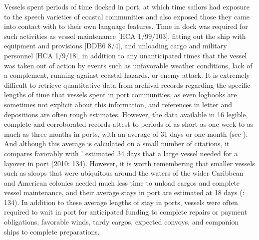 Vessels spent periods of time docked in port, at which time sailors had exposure to the speech varieties of coastal communities and also exposed those they came into contact with to their own language features. Time in dock was required for such activities as vessel maintenance [HCA 1/99/103], fitting out the ship with equipment and provisions [DDB6 8/4], and unloading cargo and military personnel [HCA 1/9/18], in addition to any unanticipated times that the vessel was taken out of action by events such as unfavorable weather conditions, lack of a  complement, running against coastal hazards, or enemy attack. It is extremely difficult to retrieve quantitative data from archival records regarding the specific lengths of time that vessels spent in port communities, as even logbooks are sometimes not explicit about this information, and references in letter and depositions are often rough estimates. However, the data available in 16 legible, complete and corroborated records attest to periods of as short as one week to as much as three months in ports, with an average of 31 days or one month (see ). And although this average is calculated on a small number of citations, it compares favorably with \citeauthor{Jarvis2010}’ estimated 34 days that a large vessel needed for a layover in port (2010: 134). However, it is worth remembering that smaller vessels such as sloops that were ubiquitous around the waters of the wider Caribbean and American colonies needed much less time to unload cargos and complete vessel maintenance, and their average stays in port are estimated at 18 days (\citealt{Jarvis2010}: 134). In addition to these average lengths of stay in ports, vessels were often required to wait in port for anticipated funding to complete repairs or payment obligations, favorable winds, tardy cargos, expected convoys, and companion ships to complete preparations. 


